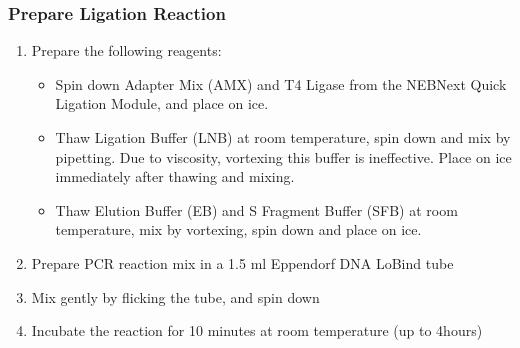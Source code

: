 \subsubsection{Prepare Ligation Reaction}
\begin{enumerate}
	\item Prepare the following reagents:
	\begin{itemize}
		\item Spin down Adapter Mix (AMX) and T4 Ligase from the NEBNext Quick Ligation Module, and place on ice.
		\item Thaw Ligation Buffer (LNB) at room temperature, spin down and mix by pipetting. Due to viscosity, vortexing this buffer is ineffective. Place on ice immediately after thawing and mixing.
		\item Thaw Elution Buffer (EB) and S Fragment Buffer (SFB) at room temperature, mix by vortexing, spin down and place on ice.
	\end{itemize}
	\item Prepare PCR reaction mix in a 1.5 ml Eppendorf DNA LoBind tube
	\item Mix gently by flicking the tube, and spin down 
	\item Incubate the reaction for 10 minutes at room temperature (up to 4hours)
\end{enumerate}

